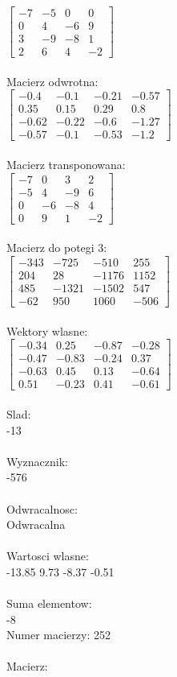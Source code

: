 \documentclass[a4paper,12pt]{article}
\begin{document}
$\begin{bmatrix} -7&-5&0&0\\0&4&-6&9\\3&-9&-8&1\\2&6&4&-2 \end{bmatrix}$
\\
\\
Macierz odwrotna:\\

$\begin{bmatrix} -0.4&-0.1&-0.21&-0.57\\0.35&0.15&0.29&0.8\\-0.62&-0.22&-0.6&-1.27\\-0.57&-0.1&-0.53&-1.2 \end{bmatrix}$
\\
\\
Macierz transponowana:\\

$\begin{bmatrix} -7&0&3&2\\-5&4&-9&6\\0&-6&-8&4\\0&9&1&-2 \end{bmatrix}$
\\
\\
Macierz do potegi 3:\\

$\begin{bmatrix} -343&-725&-510&255\\204&28&-1176&1152\\485&-1321&-1502&547\\-62&950&1060&-506 \end{bmatrix}$
\\
\\
Wektory wlasne:\\

$\begin{bmatrix} -0.34&0.25&-0.87&-0.28\\-0.47&-0.83&-0.24&0.37\\-0.63&0.45&0.13&-0.64\\0.51&-0.23&0.41&-0.61 \end{bmatrix}$
\\
\\
Slad:\\
-13
\\
\\
Wyznacznik:\\
-576
\\
\\
Odwracalnosc:\\
Odwracalna
\\
\\
Wartosci wlasne:\\
-13.85 9.73 -8.37 -0.51
\\
\\
Suma elementow:\\
-8
\\
\newpage
Numer macierzy:
252
\\
\\
Macierz:\\
\end{document}

